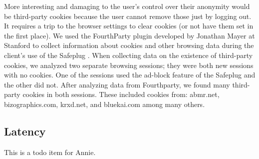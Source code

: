 More interesting and damaging to the user's control over their anonymity would be third-party cookies because the user cannot remove those just by logging out.  It requires a trip to the browser settings to clear cookies (or not have them set in the first place).  We used the FourthParty plugin developed by Jonathan Mayer at Stanford to collect information about cookies and other browsing data during the client's use of the Safeplug \cite{fourthparty}.  When collecting data on the existence of third-party cookies, we analyzed two separate browsing sessions; they were both new sessions with no cookies.  One of the sessions used the ad-block feature of the Safeplug and the other did not.  After analyzing data from Fourthparty, we found many third-party cookies in both sessions.  These included cookies from: abmr.net, bizographics.com, krxd.net, and bluekai.com among many others.

\subsection{Latency}
This is a todo item for Annie.
